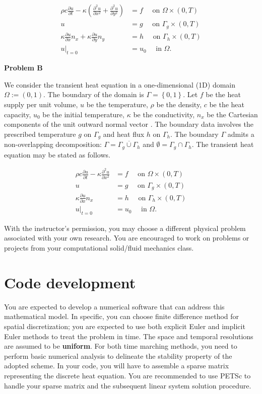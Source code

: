 \documentclass[12pt]{article}
\begin{document}
\begin{align*}
\rho c \frac{\partial u}{\partial t} - \kappa \left( \frac{\partial^2 u}{\partial x^2} + \frac{\partial^2 u}{\partial y^2} \right) &= f \quad \mbox{ on } \Omega \times (0,T) \\
u &= g \quad \mbox{ on } \Gamma_{g} \times (0,T) \\
\kappa \frac{\partial u}{\partial x} n_{x} + \kappa \frac{\partial u}{\partial y} n_{y} &= h \quad \mbox{ on } \Gamma_h \times (0,T) \\
u|_{t=0} &= u_0 \quad \mbox{ in } \Omega.
\end{align*}


\textbf{Problem B}

We consider the transient heat equation in a one-dimensional (1D) domain $\Omega := (0,1)$. The boundary of the domain is $\Gamma = \left\lbrace 0, 1 \right\rbrace$.
Let $f$ be the heat supply per unit volume, $u$ be the temperature,  $\rho$ be the density, $c$ be the heat capacity, $u_0$ be the initial temperature, $\kappa$ be the conductivity, $n_x$ be the Cartesian components of the unit outward normal vector . The boundary data involves the prescribed temperature $g$ on $\Gamma_g$ and heat flux $h$ on $\Gamma_h$. The boundary $\Gamma$ admits a non-overlapping decomposition: $\Gamma = \overline{\Gamma_{g} \cup \Gamma_h}$ and $\emptyset = \Gamma_g \cap \Gamma_h$. The transient heat equation may be stated as follows.

\begin{align*}
\rho c \frac{\partial u}{\partial t} - \kappa  \frac{\partial^2 u}{\partial x^2} &= f \quad \mbox{ on } \Omega \times (0,T) \\
u &= g \quad \mbox{ on } \Gamma_{g} \times (0,T) \\
\kappa \frac{\partial u}{\partial x} n_{x}  &= h \quad \mbox{ on } \Gamma_h \times (0,T) \\
u|_{t=0} &= u_0 \quad \mbox{ in } \Omega.
\end{align*}

With the instructor's permission, you may choose a different physical problem associated with your own research. You are encouraged to work on problems or projects from your computational solid/fluid mechanics class.



\section{Code development}
You are expected to develop a numerical software that can address this mathematical model. In specific, you can choose finite difference method for spatial discretization; you are expected to use both explicit Euler and implicit Euler methods to treat the problem in time. The space and temporal resolutions are assumed to be \textbf{uniform}. For both time marching methods, you need to perform basic numerical analysis to delineate the stability property of the adopted scheme. In your code, you will have to assemble a sparse matrix representing the discrete heat equation. You are recommended to use PETSc to handle your sparse matrix and the subsequent linear system solution procedure. 
\end{document}
